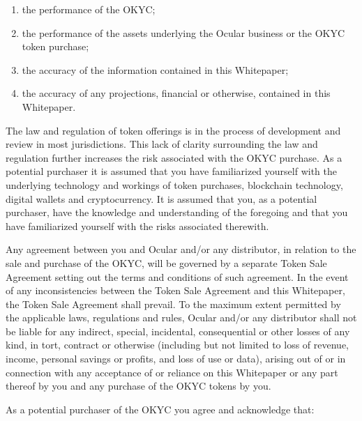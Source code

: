 \documentclass[a4paper]{article}
\begin{document}
\begin{enumerate}
\item the performance of the OKYC;
\item the performance of the assets underlying the Ocular business or the OKYC token purchase;
\item the accuracy of the information contained in this Whitepaper;
\item the accuracy of any projections, financial or otherwise, contained in this Whitepaper.
\end{enumerate}

The law and regulation of token offerings is in the process of development and review in most jurisdictions. This lack of clarity surrounding the law and regulation further increases the risk associated with the OKYC purchase. As a potential purchaser it is assumed that you have familiarized yourself with the underlying technology and workings of token purchases, blockchain technology, digital wallets and cryptocurrency. It is assumed that you, as a potential purchaser, have the knowledge and understanding of the foregoing and that you have familiarized yourself with the risks associated therewith.

Any agreement between you and Ocular and/or any distributor, in relation to the sale and purchase of the OKYC, will be governed by a separate Token Sale Agreement setting out the terms and conditions of such agreement. In the event of any inconsistencies between the Token Sale Agreement and this Whitepaper, the Token Sale Agreement shall prevail. To the maximum extent permitted by the applicable laws, regulations and rules, Ocular and/or any distributor shall not be liable for any indirect, special, incidental, consequential or other losses of any kind, in tort, contract or otherwise (including but not limited to loss of revenue, income, personal savings or profits, and loss of use or data), arising out of or in connection with any acceptance of or reliance on this Whitepaper or any part thereof by you and any purchase of the OKYC tokens by you.

As a potential purchaser of the OKYC you agree and acknowledge that:
\end{document}
